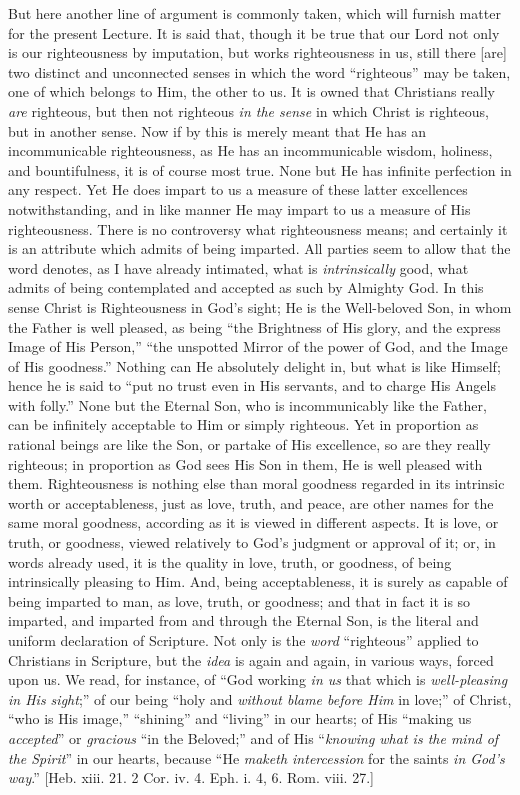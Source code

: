 But here another line of argument is commonly taken, which will
furnish matter for the present Lecture. It is said that, though it be
true that our Lord not only is our righteousness by imputation, but
works righteousness in us, still there [are] two distinct and
unconnected senses in which the word ``righteous'' may be
taken, one of which belongs to Him, the other to us. It is owned that
Christians really \emph{are} righteous, but then not righteous \emph{in
the sense} in which Christ is righteous, but in another sense. Now
if by this is merely meant that He has an incommunicable
righteousness, as He has an incommunicable wisdom, holiness, and
bountifulness, it is of course most true. None but He has infinite
perfection in any respect. Yet He does impart to us a measure of these
latter excellences notwithstanding, and in like manner He may impart
to us a measure of His righteousness. There is no controversy what
righteousness means; and certainly it is an attribute which admits of
being imparted. All parties seem to allow that the word denotes,
as I have already intimated, what is \emph{intrinsically} good, what
admits of being contemplated and accepted as such by Almighty God. In
this sense Christ is Righteousness in God's sight; He is the
Well-beloved Son, in whom the Father is well pleased, as being
``the Brightness of His glory, and the express Image of His
Person,'' ``the unspotted Mirror of the power of God, and the
Image of His goodness.'' Nothing can He absolutely delight in, but
what is like Himself; hence he is said to ``put no trust even in
His servants, and to charge His Angels with folly.'' None but the
Eternal Son, who is incommunicably like the Father, can be infinitely
acceptable to Him or simply righteous. Yet in proportion as rational
beings are like the Son, or partake of His excellence, so are they
really righteous; in proportion as God sees His Son in them, He is
well pleased with them. Righteousness is nothing else than moral
goodness regarded in its intrinsic worth or acceptableness, just as
love, truth, and peace, are other names for the same moral goodness,
according as it is viewed in different aspects. It is love, or truth,
or goodness, viewed relatively to God's judgment or approval of it;
or, in words already used, it is the quality in love, truth, or
goodness, of being intrinsically pleasing to Him. And, being
acceptableness, it is surely as capable of being imparted to man, as
love, truth, or goodness; and that in fact it is so imparted, and
imparted from and through the Eternal Son, is the literal and uniform
declaration of Scripture. Not only is the \emph{word}
``righteous'' applied to Christians in Scripture, but the \emph{idea}
is again and again, in various ways, forced upon us. We read, for instance, of ``God working \emph{in us} that which is \emph{well-pleasing
in His sight};'' of our being ``holy and \emph{without blame
before Him} in love;'' of Christ, ``who is His image,''
``shining'' and ``living'' in our hearts; of His
``making us \emph{accepted}'' or \emph{gracious} ``in the
Beloved;'' and of His ``\emph{knowing what is the mind of the
Spirit}'' in our hearts, because ``He \emph{maketh
intercession} for the saints \emph{in God's way}.'' [Heb. xiii.
21. 2 Cor. iv. 4. Eph. i. 4, 6. Rom. viii. 27.]

